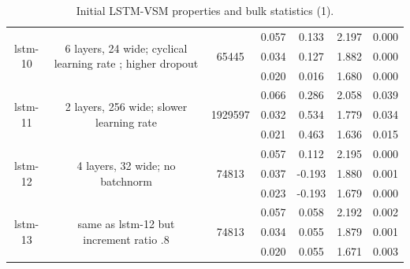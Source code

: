 \begin{table}[H]
\begin{sideways}
\begin{tabular}{c|c|c|c|c|c|c }
\hline
\multirow{3}{6em}{lstm-10} & \multirow{3}{16em}{6 layers, 24 wide; cyclical learning rate ; higher dropout} & \multirow{3}{4em}{65445} & 0.057 & 0.133 & 2.197 & 0.000 \\ & & & 0.034 & 0.127 & 1.882 & 0.000 \\ & & & 0.020 & 0.016 & 1.680 & 0.000 \\
\hline
\multirow{3}{6em}{lstm-11} & \multirow{3}{16em}{2 layers, 256 wide; slower learning rate} & \multirow{3}{4em}{1929597} & 0.066 & 0.286 & 2.058 & 0.039 \\ & & & 0.032 & 0.534 & 1.779 & 0.034 \\ & & & 0.021 & 0.463 & 1.636 & 0.015 \\
\hline
\multirow{3}{6em}{lstm-12} & \multirow{3}{16em}{4 layers, 32 wide; no batchnorm} & \multirow{3}{4em}{74813} & 0.057 & 0.112 & 2.195 & 0.000 \\ & & & 0.037 & -0.193 & 1.880 & 0.001 \\ & & & 0.023 & -0.193 & 1.679 & 0.000 \\
\hline
\multirow{3}{6em}{lstm-13} & \multirow{3}{16em}{same as lstm-12 but increment ratio .8} & \multirow{3}{4em}{74813} & 0.057 & 0.058 & 2.192 & 0.002 \\ & & & 0.034 & 0.055 & 1.879 & 0.001 \\ & & & 0.020 & 0.055 & 1.671 & 0.003 \\
    \end{tabular}
\end{sideways}
    \caption{Initial LSTM-VSM properties and bulk statistics (1).}
    \label{model-init-lstm-table-1}
\end{table}

